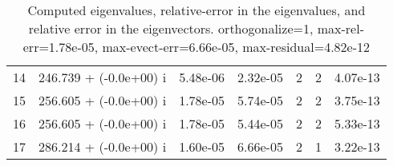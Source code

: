 \begin{table}[H]
\begin{center}
\begin{tabular}{|c|c|c|c|c|c|c|}
    14  &    246.739 + (-0.0e+00) i  &    5.48e-06      &   2.32e-05    &   2    &  2   &    4.07e-13 \\
    15  &    256.605 + (-0.0e+00) i  &    1.78e-05      &   5.74e-05    &   2    &  2   &    3.75e-13 \\
    16  &    256.605 + (-0.0e+00) i  &    1.78e-05      &   5.44e-05    &   2    &  2   &    5.33e-13 \\
    17  &    286.214 + (-0.0e+00) i  &    1.60e-05      &   6.66e-05    &   2    &  1   &    3.22e-13 \\
\hline
\end{tabular}
\caption{Computed eigenvalues, relative-error in the eigenvalues, and relative error in the eigenvectors. orthogonalize=1, max-rel-err=1.78e-05, max-evect-err=6.66e-05, max-residual=4.82e-12
}\label{table:genEigssquare64.order4.hdf}
\end{center}
\end{table}
